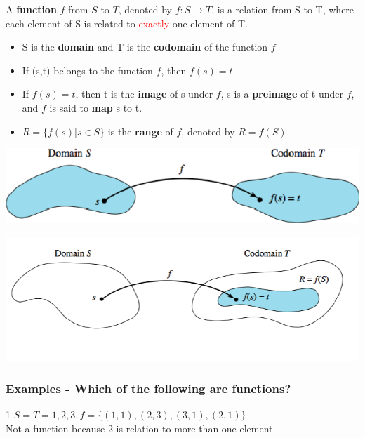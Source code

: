 \documentclass[12pt, letterpaper]{article}
\newcommand{\exheader}[1][ex]{{\tiny{#1}\normalsize}}
\begin{document}
\begin{minipage}[t]{0.65\linewidth}
	A \textbf{function} $f$ from $S$ to $T$, denoted by $f: S \rightarrow T$, is a relation from S to T, where each element of S is related to \textcolor{red}{exactly} one element of T.
	\begin{itemize}[leftmargin=*, label={}]
		\item S is the \textbf{domain} and T is the \textbf{codomain} of the function $f$
		\item If (s,t) belongs to the function $f$, then $f(s) = t$.
	\end{itemize}
	\bigbreak
	\begin{itemize}[leftmargin=*, label={}]
		\item If $f(s) = t$, then t is the \textbf{image} of s under $f$, s is a \textbf{preimage} of t under $f$, and $f$ is said to \textbf{map} s to t.
		\item $R = \{f(s) | s \in S\}$ is the \textbf{range} of $f$, denoted by $R = f(S)$
	\end{itemize}
\end{minipage}
\begin{minipage}[t]{0.35\linewidth}
	\centering
    \strut\vspace*{-\baselineskip}\newline\hspace*{0.5cm}\includegraphics[width=1.3\linewidth]{functiondia.png} \bigbreak
	\strut\vspace*{-\baselineskip}\newline\hspace*{0.5cm}\includegraphics[width=1.3\linewidth]{funcdia2.png}
\end{minipage}

\subsubsection*{Examples - Which of the following are functions?}
\exheader[1] $S = T = {1, 2, 3}, f = \{(1, 1), (2, 3), (3, 1), (2, 1)\}$ \\
Not a function because 2 is relation to more than one element \smallbreak
\end{document}
